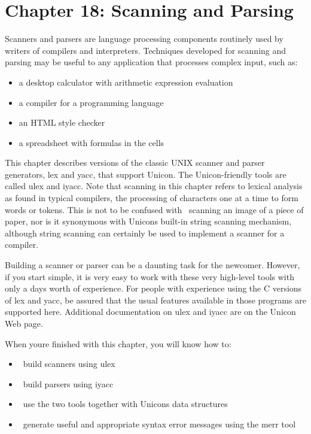 \clearpage\section{Chapter 18: Scanning and Parsing}
Scanners and parsers are language processing components routinely used
by writers of compilers and interpreters. Techniques developed for
scanning and parsing may be useful to any application that processes
complex input, such as:

\begin{itemize}
\item a desktop calculator with arithmetic expression evaluation
\item a compiler for a programming language
\item an HTML style checker
\item a spreadsheet with formulas in the cells
\end{itemize}

This chapter describes versions of the classic UNIX scanner and parser
generators, \textsf{lex} and \textsf{yacc}, that
support Unicon. The Unicon-friendly tools are called \textsf{ulex} and
\textsf{iyacc}. Note that scanning in this chapter refers to lexical
analysis as found in typical compilers, the processing of characters
one at a time to form words or tokens. This is not to be confused with
\ scanning an image of a piece of paper, nor is it synonymous with
Unicon{\textquotesingle}s built-in string scanning mechanism, although
string scanning can certainly be used to implement a scanner for a
compiler.

Building a scanner or parser can be a daunting task for
the newcomer. However, if you start simple, it is very easy to work
with these very high-level tools with only a day{\textquotesingle}s
worth of experience. For people with experience using the C versions of
\textsf{lex} and \textsf{yacc}, be assured that the usual features
available in those programs are supported here. Additional
documentation on \textsf{ulex} and \textsf{iyacc} are on the Unicon Web
page.

When you{\textquotesingle}re finished with this chapter, you will know
how to:

\begin{itemize}
\item \ build scanners using \textsf{ulex}
\item \ build parsers using \textsf{iyacc}
\item \ use the two tools together with Unicon{\textquotesingle}s data
structures
\item \ generate useful and appropriate syntax error messages using the
\textsf{merr} tool
\end{itemize}
